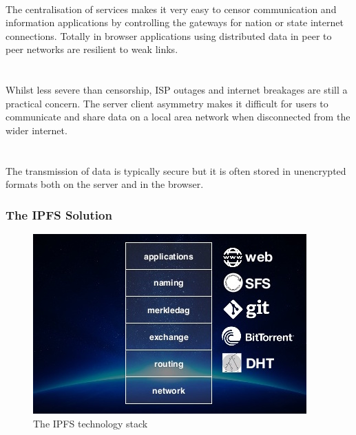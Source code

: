 \\
The centralisation of services makes it very easy to censor communication and information applications by controlling the gateways for nation or state internet connections. Totally in browser applications using distributed data in peer to peer networks are resilient to weak links.\\
\\
\\
Whilst less severe than censorship, ISP outages and internet breakages are still a practical concern. The server client asymmetry makes it difficult for users to communicate and share data on a local area network when disconnected from the wider internet. \\
\\
\\
The transmission of data is typically secure but it is often stored in unencrypted formats both on the server and in the browser. \\

\subsubsection{The IPFS Solution}
\begin{figure}
\centering
\includegraphics[width=\textwidth]{Figures/IpfsStack}
\decoRule
\caption[IPFS Stack]{The IPFS technology stack}
\label{fig:IpfsStack}
\end{figure}

